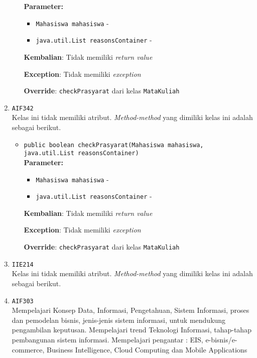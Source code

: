 \documentclass{article}
\begin{document}
\begin{enumerate}
\begin{itemize}
\textbf{Parameter:}\begin{itemize}
\item \texttt{Mahasiswa mahasiswa} - 
\item \texttt{java.util.List reasonsContainer} - 
\end{itemize}
\textbf{Kembalian}: Tidak memiliki \textit{return value}

\textbf{Exception}: Tidak memiliki \textit{exception}

\textbf{Override}: \texttt{checkPrasyarat} dari kelas \texttt{MataKuliah}

\end{itemize}
\item \texttt{AIF342}\\ 
Kelas ini tidak memiliki atribut. \textit{Method-method} yang dimiliki kelas ini adalah sebagai berikut.
\begin{itemize}
\item \texttt{public boolean checkPrasyarat(Mahasiswa mahasiswa, java.util.List reasonsContainer)}\\ 


\textbf{Parameter:}\begin{itemize}
\item \texttt{Mahasiswa mahasiswa} - 
\item \texttt{java.util.List reasonsContainer} - 
\end{itemize}
\textbf{Kembalian}: Tidak memiliki \textit{return value}

\textbf{Exception}: Tidak memiliki \textit{exception}

\textbf{Override}: \texttt{checkPrasyarat} dari kelas \texttt{MataKuliah}

\end{itemize}
\item \texttt{IIE214}\\ 
Kelas ini tidak memiliki atribut. \textit{Method-method} yang dimiliki kelas ini adalah sebagai berikut.
\begin{itemize}
\end{itemize}
\item \texttt{AIF303}\\ 
Mempelajari Konsep Data, Informasi, Pengetahuan, Sistem Informasi, proses dan
 pemodelan bisnis, jenis-jenis sistem informasi, untuk mendukung pengambilan
 keputusan. Mempelajari trend Teknologi Informasi, tahap-tahap pembangunan
 sistem informasi. Mempelajari pengantar : EIS, e-bisnis/e-commerce, Business
 Intelligence, Cloud Computing dan Mobile Applications


\end{enumerate}
\end{document}
